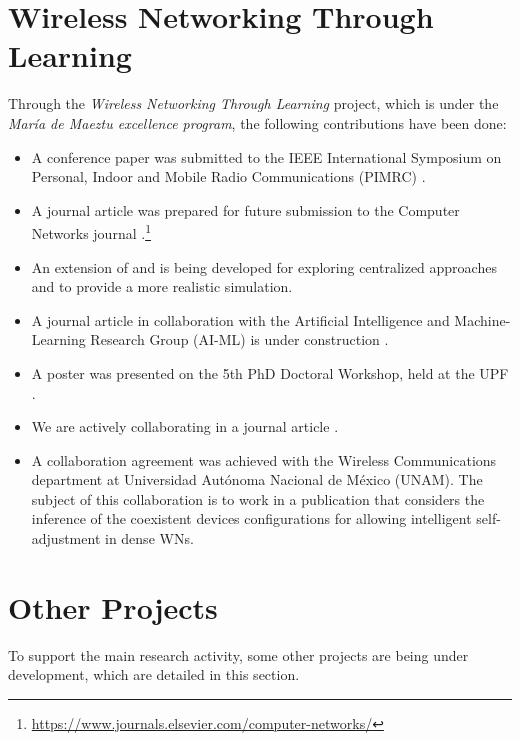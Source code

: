 \documentclass[12pt, a4paper,twoside]{tesi_upf}
\begin{document}
		\section{Wireless Networking Through Learning}
		\label{section:mdm}		
			Through the \textit{Wireless Networking Through Learning} project, which is under the \textit{Mar\'ia de Maeztu excellence program}, the following contributions have been done:
			\begin{itemize}
				\item A conference paper was submitted to the IEEE International Symposium on Personal, Indoor and Mobile Radio Communications (PIMRC) \cite{wilhelmi2017implications}.
				\item A journal article was prepared for future submission to the Computer Networks journal \cite{wilhelmi2017enhancing}.\footnote{\url{https://www.journals.elsevier.com/computer-networks/}}
				\item An extension of \cite{wilhelmi2017enhancing} and \cite{wilhelmi2017implications} is being developed for exploring centralized approaches and to provide a more realistic simulation.
				\item A journal article in collaboration with the Artificial Intelligence and Machine-Learning Research Group (AI-ML) is under construction \cite{bellalta2017learning}.
				\item A poster was presented on the 5th PhD Doctoral Workshop, held at the UPF \cite{wilhelmi2017improving}.
				\item We are actively collaborating in a journal article \cite{barrachina2017ctmn}.
				\item A collaboration agreement was achieved with the Wireless Communications department at Universidad Aut\'onoma Nacional de M\'exico (UNAM). The subject of this collaboration is to work in a publication that considers the inference of the coexistent devices configurations for allowing intelligent self-adjustment in dense WNs.
			\end{itemize}	
			
		\section{Other Projects}
		\label{section:other_projects}	
			To support the main research activity, some other projects are being under development, which are detailed in this section.
			
\end{document}
